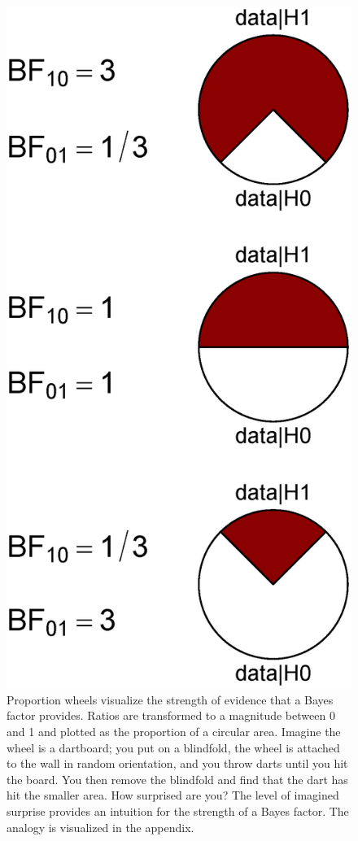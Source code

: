 \begin{figure}[!t]
    \begin{center}
        \includegraphics[width=.5\textwidth]{figs/bi2_PizzaPlot.eps}
        \caption{Proportion wheels visualize the strength of evidence that a Bayes factor provides. Ratios are transformed to a magnitude between 0 and 1 and plotted as the proportion of a circular area. Imagine the wheel is a dartboard; you put on a blindfold, the wheel is attached to the wall in random orientation, and you throw darts until you hit the board. You then remove the blindfold and find that the dart has hit the smaller area. How surprised are you? The level of imagined surprise provides an intuition for the strength of a Bayes factor. The analogy is visualized in the appendix.}\label{fig:bi2:PizzaPlot}
    \end{center}
\end{figure}

